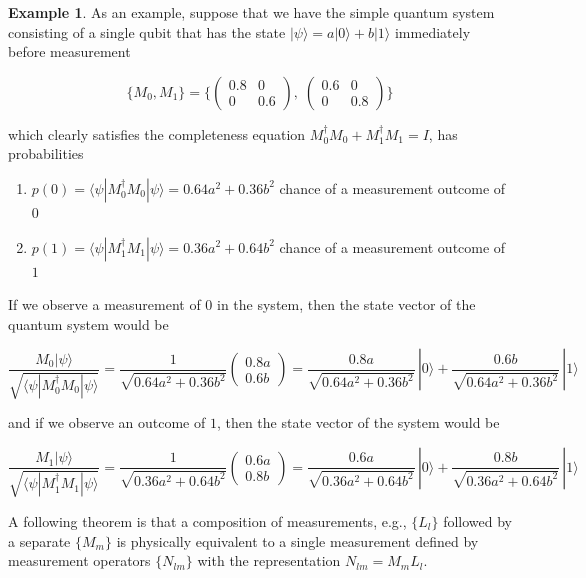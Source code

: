 \documentclass{article}
\theoremstyle{definition}
\newtheorem{example}{Example}[section]
\begin{document}
    \begin{example}
      As an example, suppose that we have the simple quantum system consisting of a single qubit that has the state $|\psi \rangle = a|0\rangle + b|1 \rangle$ immediately before measurement

        \[\{M_0, M_1\} = \bigg\{ \begin{pmatrix} 0.8 & 0 \\  0 & 0.6 \end{pmatrix}, \; \begin{pmatrix} 0.6&0\\0&0.8 \end{pmatrix} \bigg\}\]

      which clearly satisfies the completeness equation $M_0^\dagger M_0 + M_1^\dagger M_1 = I$, has probabilities

      \begin{enumerate}
        \item $p(0) = \langle \psi | M_0^\dagger M_0 | \psi \rangle = 0.64 a^2 + 0.36b^2$ chance of a measurement outcome of $0$
        \item $p(1) = \langle \psi | M_1^\dagger M_1 | \psi \rangle = 0.36 a^2 + 0.64b^2$ chance of a measurement outcome of $1$
      \end{enumerate}

      If we observe a measurement of $0$ in the system, then the state vector of the quantum system would be

        \[\frac{M_0 | \psi\rangle}{\sqrt{\langle \psi | M_0^\dagger M_0 | \psi\rangle}} = \frac{1}{\sqrt{0.64a^2 + 0.36b^2}} \begin{pmatrix} 0.8a \\ 0.6b \end{pmatrix} = \frac{0.8a}{\sqrt{0.64a^2 + 0.36b^2}}\, |0 \rangle + \frac{0.6 b}{\sqrt{0.64a^2 + 0.36b^2}} \, |1\rangle\]

      and if we observe an outcome of $1$, then the state vector of the system would be

        \[\frac{M_1 | \psi\rangle}{\sqrt{\langle \psi | M_1^\dagger M_1 | \psi\rangle}} = \frac{1}{\sqrt{0.36a^2 + 0.64b^2}} \begin{pmatrix} 0.6a \\ 0.8b \end{pmatrix} = \frac{0.6a}{\sqrt{0.36a^2 + 0.64b^2}}\, |0 \rangle + \frac{0.8 b}{\sqrt{0.36a^2 + 0.64b^2}} \, |1\rangle\]
    \end{example}

    A following theorem is that a composition of measurements, e.g., $\{L_l\}$ followed by a separate $\{M_m\}$ is physically equivalent to a single measurement defined by measurement operators $\{N_{lm}\}$ with the representation $N_{lm} = M_m L_l$.
\end{document}
